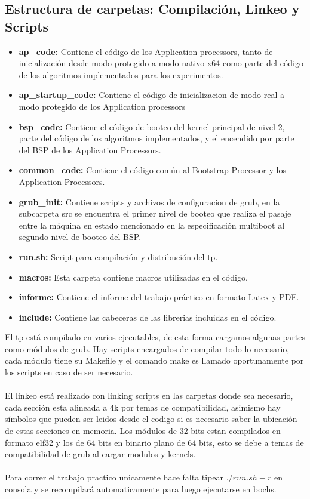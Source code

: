     \subsection{Estructura de carpetas: Compilación, Linkeo y Scripts}
    \begin{itemize}
	    \item \textbf{ap\_code: } Contiene el código de los Application processors, tanto de inicialización desde modo protegido a modo nativo x64 como parte del código de los algoritmos implementados para los experimentos.
		\item \textbf{ap\_startup\_code: } Contiene el código de inicializacion de modo real a modo protegido de los Application processors
		\item \textbf{bsp\_code: } Contiene el código de booteo del kernel principal de nivel 2, parte del código de los algoritmos implementados, y el encendido por parte del BSP de los Application Processors.
		\item \textbf{common\_code: } Contiene el código común al Bootstrap Processor y los Application Processors.
		\item \textbf{grub\_init: } Contiene scripts y archivos de configuracion de grub, en la subcarpeta src se encuentra el primer nivel de booteo que realiza el pasaje entre la máquina en estado mencionado en la especificación multiboot al segundo nivel de booteo del BSP.
		\item \textbf{run.sh: } Script para compilación y distribución del tp.
		\item \textbf{macros: } Esta carpeta contiene macros utilizadas en el código.
		\item \textbf{informe: } Contiene el informe del trabajo práctico en formato Latex y PDF.
		\item \textbf{include: } Contiene las cabeceras de las librerias incluidas en el código.
    \end{itemize}

    El tp está compilado en varios ejecutables, de esta forma cargamos algunas partes como módulos de grub.
    Hay scripts encargados de compilar todo lo necesario, cada módulo tiene su Makefile y el comando make es llamado
    oportunamente por los scripts en caso de ser necesario.
    \\
    \\
    El linkeo está realizado con linking scripts en las carpetas donde sea necesario,
    cada sección esta alineada a 4k por temas de compatibilidad, asimismo hay símbolos que pueden ser leidos desde el codigo si es necesario saber la ubicación de estas secciones en memoria.
    Los módulos de 32 bits estan compilados en formato elf32 y los de 64 bits en binario plano de 64 bits, esto se debe a temas de compatibilidad de grub al cargar modulos y kernels.
    \\
    \\
    Para correr el trabajo practico unicamente hace falta tipear $./run.sh -r$ en consola y se recompilará automaticamente para luego ejecutarse en bochs.
